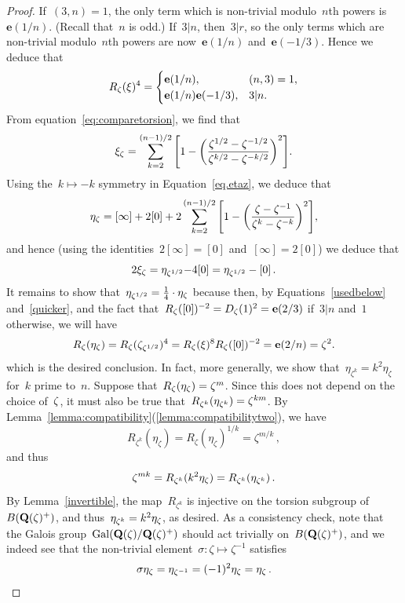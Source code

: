 \documentclass[12pt,reqno]{amsart}
\theoremstyle{definition}
\newcommand{\changed}[1]{{#1}}
\def\be{\begin{equation}}
\def\ee{\end{equation}}
\def\Q{\mathbf Q}   %
\def\nn{n}
\def\e{\mathbf{e}}
\def\Gal{\mathrm{Gal}}
\begin{document}
\begin{proof}
{   If~$(3,n) = 1$, the only term which is non-trivial modulo~$n$th powers is~$\e(1/n)$. (Recall that~$n$ is odd.)
   If~$3|n$, then~$3|r$,  so the only terms which are non-trivial modulo~$n$th powers
   are now~$\e(1/n)$ and~$\e(-1/3)$. Hence we deduce that
   \be
   \label{usedbelow}
   R_{\z}(\xi)^4 = \begin{cases} \e(1/n), & (n,3) = 1, \\
   \e(1/n)\e(-1/3), & 3|n. \end{cases} 
   \ee 
   }
 From equation~\eqref{eq:comparetorsion}, we find that
$$
\xi_\z = 
\sum_{k=2}^{(\nn-1)/2}
\changed{\left[ 1 - \left(\frac{\z^{1/2}-\z^{-1/2}}{\z^{k/2}-\z^{-k/2}}\right)^2 \right]}.
$$
Using the~$k \mapsto -k$ symmetry in 
Equation~\eqref{eq.etaz}, we deduce that
$$
\eta_\z = 
\changed{[\infty] + 2 [0] + 
2 
\sum_{k=2}^{(\nn-1)/2}
\left[ 1 - \left(\frac{\z-\z^{-1}}{\z^{k}-\z^{-k}}\right)^2 \right]
},$$
and hence  (\changed{using the identities~$2[\infty] = [0]$ and~$[\infty] = 2[0]$}) we deduce that
\be 
\label{quicker}
2 \xi_{\z} =  \eta_{\z^{1/2}} \changed{- 4 [0] =\eta_{\z^{1/2}}  - [0]} \,.
\ee
It remains to show that~$\eta_{\zeta^{1/2}} = \frac{1}{4} \cdot \eta_{\zeta}$
because then, by Equations~\eqref{usedbelow} and~\eqref{quicker},
\changed{and the fact that~$R_{\z}([0])^{-2} = D_{\z}(1)^{2} = \e(2/3)$ if~$3|n$ and~$1$ otherwise},
we will have
$$
R_{\z}(\eta_{\z}) = R_{\z}(\zeta_{\z^{1/2}})^4
=
\changed{ R_{\z}(\xi)^8  R_{\z}([0])^{-2} = \e(2/n)}
= \zeta^2.$$
which is the desired conclusion. In fact, more generally, we show 
that~$\eta_{\zeta^k} = k^2 \eta_{\zeta}$ for~$k$ prime to~$\nn$.
Suppose that~$R_{\zeta}(\eta_{\zeta}) = \zeta^{m}$. Since this does not depend
on the choice of~$\zeta$, it must also be true 
that~$R_{\zeta^k}(\eta_{\zeta^k}) = \zeta^{km}$. 
By Lemma~\ref{lemma:compatibility}(\ref{lemma:compatibilitytwo}), we have
$$
R_{\zeta^k}(\eta_{\zeta}) = R_{\zeta}(\eta_{\zeta})^{1/k} = \zeta^{m/k} \,,
$$
and thus
$$
\zeta^{mk} = R_{\zeta^k}(k^2 \eta_{\zeta}) = R_{\zeta^k}(\eta_{\zeta^k}) \,.
$$
By Lemma~\ref{invertible}, the map~$R_{\zeta^k}$ is injective on the torsion 
subgroup of~$B(\Q(\z)^{+})$, and thus~$\eta_{\zeta^k} = k^2 \eta_{\zeta}$, as desired. 
As a consistency check, note that the Galois group~$\Gal(\Q(\z)/\Q(\z)^{+})$
should act trivially on~$B(\Q(\z)^{+})$, and we indeed see that the 
non-trivial element~$\sigma: \zeta \mapsto \zeta^{-1}$ satisfies
$$
\sigma \eta_{\zeta} = \eta_{\zeta^{-1}} = (-1)^2 \eta_{\zeta} = \eta_{\zeta} \,.
$$
\end{proof}
\end{document}
